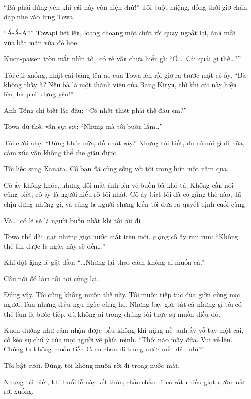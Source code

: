 \documentclass[../main.tex]{subfiles}
\begin{document}
``Bà phải đứng yên khi cái này còn hiện chứ!'' Tôi buột miệng, đồng thời giơ chân đạp nhẹ vào lưng Towa.

``Á-Á-Á!!'' Towapi hét lên, loạng choạng một chút rồi quay ngoắt lại, ánh mắt vừa bất mãn vừa đỏ hoe.

Kuon-paisen tròn mắt nhìn tôi, có vẻ vẫn chưa hiểu gì: ``Ơ\dots\ Cái quái gì thế\dots?''

Tôi cúi xuống, nhặt cái bảng tên ảo của Towa lên rồi giơ ra trước mặt cô ấy. ``Bà không thấy à? Nếu bà là một thành viên của Bang Kiryu, thì khi cái này hiện lên, bà phải đứng yên!''

Anh Tổng chỉ biết lắc đầu: ``Có nhất thiết phải thế đâu em?''

Towa dù thế, vẫn sụt sịt: ``Nhưng mà tôi buồn lắm\dots''


Tôi cười nhẹ. ``Đừng khóc nữa, đồ nhát cáy.'' Nhưng tôi biết, dù có nói gì đi nữa, cảm xúc vẫn không thể che giấu được.

Tôi liếc sang Kanata. Cô bạn đã cùng sống với tôi trong hơn một năm qua.

Cô ấy không khóc, nhưng đôi mắt ánh lên vẻ buồn bã khó tả. Không cần nói cũng biết, cô ấy là người hiểu rõ tôi nhất. Cô ấy biết tôi đã cố gắng thế nào, đã chịu đựng những gì, và cũng là người chứng kiến tôi đưa ra quyết định cuối cùng.

Và\dots\ có lẽ sẽ là người buồn nhất khi tôi rời đi.

Towa thở dài, gạt những giọt nước mắt trên môi, giọng cô ấy run run: ``Không thể tin được là ngày này sẽ đến\dots''

Khỉ đột lặng lẽ gật đầu: ``\dots Nhưng lại theo cách không ai muốn cả.''

Câu nói đó làm tôi hơi cứng lại.

Đúng vậy. Tôi cũng không muốn thế này. Tôi muốn tiếp tục đùa giỡn cùng mọi người, làm những điều ngu ngốc cùng họ. Nhưng bây giờ, tất cả những gì tôi có thể làm là bước tiếp, dù không ai trong chúng tôi thực sự muốn điều đó.

Kuon dường như cảm nhận được bầu không khí nặng nề, anh ấy vỗ tay một cái, cố kéo sự chú ý của mọi người về phía mình. ``Thôi nào mấy đứa. Vui vẻ lên. Chúng ta không muốn tiễn Coco-chan đi trong nước mắt đâu nhỉ?''

Tôi bật cười. Đúng, tôi không muốn rời đi trong nước mắt.

Nhưng tôi biết, khi buổi lễ này kết thúc, chắc chắn sẽ có rất nhiều giọt nước mắt rơi xuống.
\end{document}
